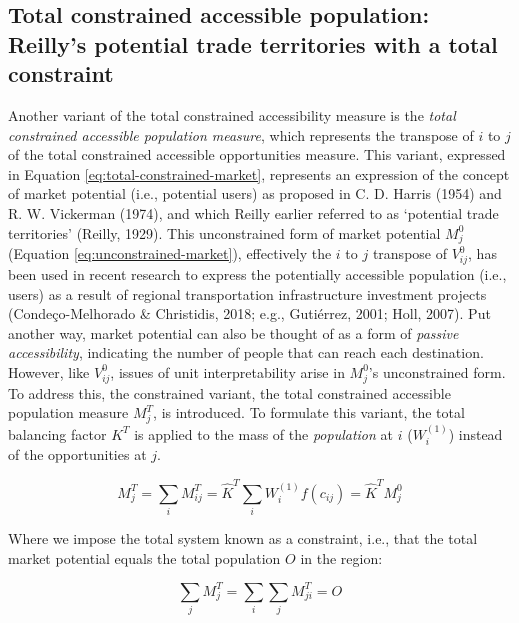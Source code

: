 \documentclass[
11pt, %
oneside, %
english, %
singlespacing, %
]{macthesis} %
\begin{document}
\subsection{Total constrained accessible population: Reilly's potential trade territories with a total constraint}\label{total-constrained-accessible-population-reillys-potential-trade-territories-with-a-total-constraint}

Another variant of the total constrained accessibility measure is the \emph{total constrained accessible population measure}, which represents the transpose of \(i\) to \(j\) of the total constrained accessible opportunities measure. This variant, expressed in Equation \ref{eq:total-constrained-market}, represents an expression of the concept of market potential (i.e., potential users) as proposed in C. D. Harris (1954) and R. W. Vickerman (1974), and which Reilly earlier referred to as `potential trade territories' (Reilly, 1929). This unconstrained form of market potential \(M_j^0\) (Equation \ref{eq:unconstrained-market}), effectively the \(i\) to \(j\) transpose of \(V^0_{ij}\), has been used in recent research to express the potentially accessible population (i.e., users) as a result of regional transportation infrastructure investment projects (Condeço-Melhorado \& Christidis, 2018; e.g., Gutiérrez, 2001; Holl, 2007). Put another way, market potential can also be thought of as a form of \emph{passive accessibility}, indicating the number of people that can reach each destination. However, like \(V_{ij}^0\), issues of unit interpretability arise in \(M_j^0\)'s unconstrained form. To address this, the constrained variant, the total constrained accessible population measure \(M^T_{j}\), is introduced. To formulate this variant, the total balancing factor \(K^T\) is applied to the mass of the \emph{population} at \(i\) (\(W_i^{(1)}\)) instead of the opportunities at \(j\).

\begin{equation}
\label{eq:total-constrained-market}
M^T_{j} = \sum_i M^T_{ij} = \hat K^T \sum_i W_i^{(1)} f(c_{ij}) = \hat K^T M_{j}^0
\end{equation} 

Where we impose the total system known as a constraint, i.e., that the total market potential equals the total population \(O\) in the region:

\begin{equation}
\label{eq:total-constraint-market}
\sum_j M^T_{j} = \sum_i\sum_j M^T_{ji} = O
\end{equation} 
\end{document}
